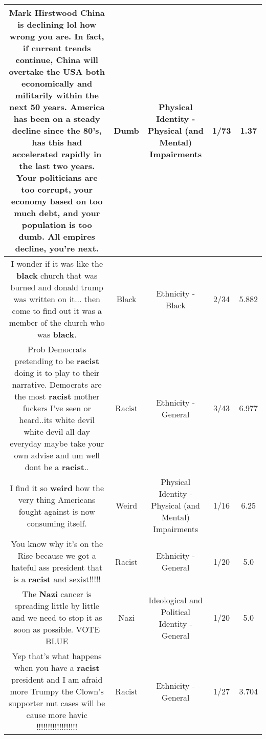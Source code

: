 \documentclass[11pt]{article}
\newlength\mylength
\begin{document}
\begin{center}
\begin{longtable}{|C{.65\mylength}|C{.30\mylength}|C{.12\mylength}|C{.12\mylength}|C{.12\mylength}|}
  \small Mark Hirstwood China is declining lol how wrong you are. In fact, if current trends continue, China will overtake the USA both economically and militarily within the next 50 years. America has been on a steady decline since the 80's, has this had accelerated rapidly in the last two years. Your politicians are too corrupt, your economy based on too much debt, and your population is too \textbf{dumb}. All empires decline, you're next.\normalsize   & Dumb & Physical Identity - Physical (and Mental) Impairments & 1/73 & 1.37 \\  \hline
  \small I wonder if it was like the \textbf{black} church that was burned and donald trump was written on it... then come to find out it was a member of the church who was \textbf{black}.\normalsize   & Black & Ethnicity - Black & 2/34 & 5.882 \\  \hline
  \small Prob Democrats pretending to be \textbf{racist} doing it to play to their narrative. Democrats are the most \textbf{racist} mother fuckers I've seen or heard..its white devil white devil all day everyday maybe take your own advise and um well dont be a \textbf{racist}..\normalsize   & Racist & Ethnicity - General & 3/43 & 6.977 \\  \hline
  \small I find it so \textbf{weird} how the very thing Americans fought against is now consuming itself.\normalsize   & Weird & Physical Identity - Physical (and Mental) Impairments & 1/16 & 6.25 \\  \hline
  \small You know why it's on the Rise because we got a hateful ass president that is a \textbf{racist} and sexist!!!!!\normalsize   & Racist & Ethnicity - General & 1/20 & 5.0 \\  \hline
  \small The \textbf{Nazi} cancer is spreading little by little and we need to stop it as soon as possible. VOTE BLUE\normalsize   & Nazi &  Ideological and Political Identity - General & 1/20 & 5.0 \\  \hline
  \small Yep that's what happens when you have a \textbf{racist} president and I am afraid more Trumpy the Clown's supporter nut cases will be cause more havic !!!!!!!!!!!!!!!!!!\normalsize   & Racist & Ethnicity - General & 1/27 & 3.704 \\  \hline

\end{longtable}
\end{center}
\end{document}
